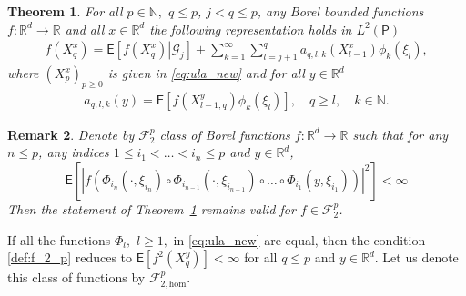\documentclass[bj]{imsart}
\def\PE{\mathsf{E}}
\def\nset{\mathbb{N}}
\def\rset{\mathbb{R}}
\def\rset{\mathbb{R}}
\newtheorem{thm}{Theorem}
\newtheorem{remark}[thm]{Remark}
\begin{document}
\begin{thm}\label{thm:main-repr}
For all $p \in \nset,$ $q \leq p$, $j < q \leq p$, any Borel bounded functions $f: \rset^d \rightarrow \rset$ and all $x \in \rset^d$ the following representation holds in \(L^2(\mathsf{P})\)
\begin{eqnarray}
\label{eq:mart_repr}
f(X^x_{q})=\mathsf{E}\left[\left.f(X^x_{q})\right|\mathcal G_{j}\right]+\sum_{k=1}^{\infty}\sum_{l=j+1}^{q}a_{q,l,k}(X^x_{l-1})\phi_k\left(\xi_{l}\right),
\end{eqnarray}
where \((X^x_{p})_{p\geq 0}\) is given in \eqref{eq:ula_new} and for all $y \in \rset^d$
\begin{eqnarray}
\label{eq:coeff_mart}
a_{q,l,k}(y)=\mathsf{E}\left[f(X^y_{l-1,q})\phi_k\left(\xi_{l}\right)\right], \quad q\geq l, \quad k\in \nset.
\end{eqnarray}
\end{thm}


\begin{remark}\label{rem:general_moments} Denote by $\mathcal{F}_2^p$ class of Borel functions $f: \rset^d \to \rset$ such that for any $n \leq p$, any indices $1 \leq i_1 < \ldots < i_n \leq p$ and $y \in \rset^d$,
\begin{equation}
\label{def:f_2_p}
\mathsf{E}\left[\left |f(\Phi_{i_n}(\cdot,\xi_{i_n})\circ\Phi_{i_{n-1}}(\cdot,\xi_{i_{n-1}})\circ\dots\circ\Phi_{i_{1}}(y,\xi_{i_{1}}))\right|^{2}\right]<\infty
\end{equation}
Then the statement of Theorem~\ref{thm:main-repr} remains valid for $f \in \mathcal{F}_2^p$.
\end{remark}

If  all the functions $\Phi_l,$ $l\geq 1,$ in \eqref{eq:ula_new} are equal, then the condition \eqref{def:f_2_p} reduces to $\PE \left[ f^2(X_q^y)\right] < \infty$ for all $q \leq p$ and $y \in \rset^d$. Let us denote this class of functions by $\mathcal{F}_{2,\text{hom}}^p$.
\end{document}
